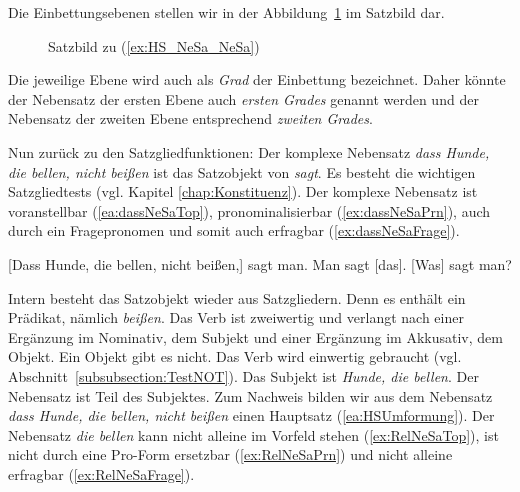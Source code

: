 Die Einbettungsebenen stellen wir in der Abbildung~\ref{Abb:Satzbild_Hunde} im Satzbild dar.

\begin{figure}
    \centering
    
    \caption{Satzbild zu (\ref{ex:HS_NeSa_NeSa})}
    \label{Abb:Satzbild_Hunde}
\end{figure}

Die jeweilige Ebene wird auch als \textit{Grad} der Einbettung bezeichnet. Daher könnte der Nebensatz der ersten Ebene auch \textit{ersten Grades} genannt werden und der Nebensatz der zweiten Ebene entsprechend \textit{zweiten Grades}.

Nun zurück zu den Satzgliedfunktionen: Der komplexe Nebensatz \textit{dass Hunde, die bellen, nicht beißen} ist das Satzobjekt von \textit{sagt}. Es besteht die wichtigen Satzgliedtests (vgl. Kapitel \ref{chap:Konstituenz}). Der komplexe Nebensatz ist voranstellbar (\ref{ea:dassNeSaTop}), pronominalisierbar (\ref{ex:dassNeSaPrn}), auch durch ein Fragepronomen und somit auch erfragbar (\ref{ex:dassNeSaFrage}).

\ea \label{ea:NeSaSGTests}
\ea \label{ea:dassNeSaTop} [Dass Hunde, die bellen, nicht beißen,] sagt man.
\ex \label{ex:dassNeSaPrn} Man sagt [das].
\ex \label{ex:dassNeSaFrage} [Was] sagt man?
\z 
\z 

Intern besteht das Satzobjekt wieder aus Satzgliedern. Denn es enthält ein Prädikat, nämlich \textit{beißen}. Das Verb ist zweiwertig und verlangt nach einer Ergänzung im Nominativ, dem Subjekt und einer Ergänzung im Akkusativ, dem Objekt. Ein Objekt gibt es nicht. Das Verb wird einwertig gebraucht (vgl. Abschnitt~\ref{subsubsection:TestNOT}). Das Subjekt ist \textit{Hunde, die bellen}. Der Nebensatz ist Teil des Subjektes. Zum Nachweis bilden wir aus dem Nebensatz \textit{dass Hunde, die bellen, nicht beißen} einen Hauptsatz (\ref{ea:HSUmformung}). Der Nebensatz \textit{die bellen} kann nicht alleine im Vorfeld stehen (\ref{ex:RelNeSaTop}), ist nicht durch eine Pro-Form ersetzbar (\ref{ex:RelNeSaPrn}) und nicht alleine erfragbar (\ref{ex:RelNeSaFrage}). 

\ea \label{ea:NeSaAttrTests}
\label{ea:HSUmformung} 
\label{ex:RelNeSaTop}
\label{ex:RelNeSaPrn}
\label{ex:RelNeSaFrage}
\z 
\z 

